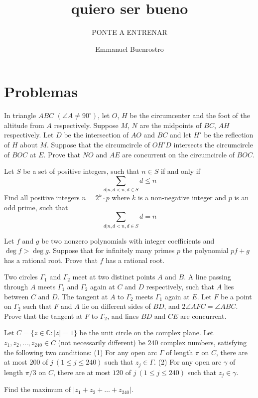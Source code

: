 \documentclass[11pt]{scrartcl}
\title{quiero ser bueno }
\subtitle{PONTE A ENTRENAR}
\author{Emmanuel Buenrostro}
\begin{document}
\maketitle

\section{Problemas}
\begin{problem}[2052086795458]
In triangle $ABC$ $(\angle A\neq 90^\circ)$, let $O$, $H$ be the circumcenter and the foot of the altitude from $A$ respectively. Suppose $M$, $N$ are the midpoints of $BC$, $AH$ respectively. Let $D$ be the intersection of $AO$ and $BC$ and let $H'$ be the reflection of $H$ about $M$. Suppose that the circumcircle of $OH'D$ intersects the circumcircle of $BOC$ at $E$. Prove that $NO$ and $AE$ are concurrent on the circumcircle of $BOC$.
\end{problem}
\begin{problem}[5393780000902]
Let $S$ be a set of positive integers, such that $n \in S$ if and only if$$\sum_{d|n,d<n,d \in S} d \le n$$Find all positive integers $n=2^k \cdot p$ where $k$ is a non-negative integer and $p$ is an odd prime, such that$$\sum_{d|n,d<n,d \in S} d = n$$
\end{problem}
\begin{problem}[7144061033013]
Let $f$ and $g$ be two nonzero polynomials with integer coefficients and $\deg f>\deg g$. Suppose that for infinitely many primes $p$ the polynomial $pf+g$ has a rational root. Prove that $f$ has a rational root.
\end{problem}
\begin{problem}[7618489197525]
	Two circles $\Gamma_1$ and $\Gamma_2$ meet at two distinct points $A$ and $B$. A line passing through $A$ meets $\Gamma_1$ and $\Gamma_2$ again at $C$ and $D$ respectively, such that $A$ lies between $C$ and $D$. The tangent at $A$ to $\Gamma_2$ meets $\Gamma_1$ again at $E$. Let $F$ be a point on $\Gamma_2$ such that $F$ and $A$ lie on different sides of $BD$, and $2\angle AFC=\angle ABC$. Prove that the tangent at $F$ to $\Gamma_2$, and lines $BD$ and $CE$ are concurrent.
\end{problem}
\begin{problem}[8981474656956]
Let $C=\{ z \in \mathbb{C} : |z|=1 \}$ be the unit circle on the complex plane. Let $z_1, z_2, \ldots, z_{240} \in C$ (not necessarily different) be $240$ complex numbers, satisfying the following two conditions:
(1) For any open arc $\Gamma$ of length $\pi$ on $C$, there are at most $200$ of $j ~(1 \le j \le 240)$ such that $z_j \in \Gamma$.
(2) For any open arc $\gamma$ of length $\pi/3$ on $C$, there are at most $120$ of $j ~(1 \le j \le 240)$ such that $z_j \in \gamma$.

Find the maximum of $|z_1+z_2+\ldots+z_{240}|$.
\end{problem}
\end{document}
